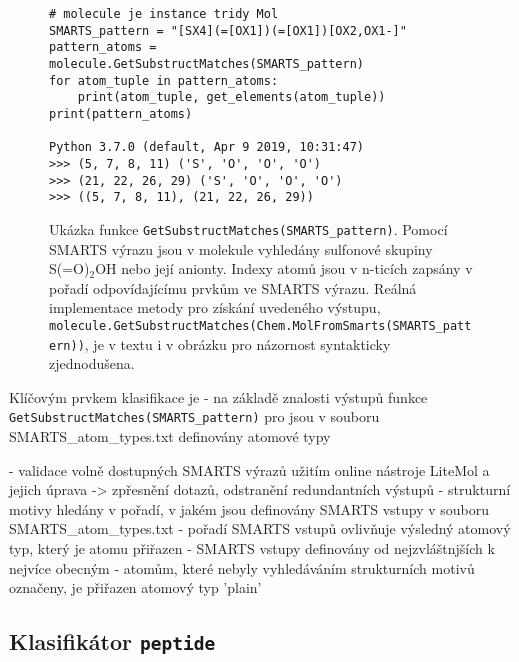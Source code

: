 \begin{figure}[h]
\label{smarts_tuples}
\begin{lstlisting}
# molecule je instance tridy Mol
SMARTS_pattern = "[SX4](=[OX1])(=[OX1])[OX2,OX1-]"
pattern_atoms = molecule.GetSubstructMatches(SMARTS_pattern)
for atom_tuple in pattern_atoms:
    print(atom_tuple, get_elements(atom_tuple))
print(pattern_atoms)

Python 3.7.0 (default, Apr 9 2019, 10:31:47)
>>> (5, 7, 8, 11) ('S', 'O', 'O', 'O')
>>> (21, 22, 26, 29) ('S', 'O', 'O', 'O')
>>> ((5, 7, 8, 11), (21, 22, 26, 29))
\end{lstlisting}
\cprotect\caption{Ukázka funkce \verb|GetSubstructMatches(SMARTS_pattern)|. Pomo\-cí SMARTS výrazu
jsou v molekule vyhledány sulfonové skupiny S(=O)$_2$OH nebo její anionty. Indexy atomů jsou v n-ticích zapsány v pořadí odpovídajícímu prvkům ve SMARTS výrazu. Reálná implementace metody pro získání uvedeného výstupu, \verb|molecule.GetSubstructMatches(Chem.MolFromSmarts(SMARTS_pattern))|, je v textu i v obrázku pro názornost syntakticky zjednodušena.}
\end{figure}

Klíčovým prvkem klasifikace je 
- na základě znalosti výstupů funkce \verb|GetSubstructMatches(SMARTS_pattern)| pro jsou v souboru SMARTS\_atom\_types.txt definovány atomové typy 


- validace volně dostupných SMARTS výrazů užitím online nástroje LiteMol a jejich úprava -> zpřesnění dotazů, odstranění redundantních výstupů 
- strukturní motivy hledány v pořadí, v jakém jsou definovány SMARTS vstupy v souboru SMARTS\_atom\_types.txt - pořadí SMARTS vstupů ovlivňuje výsledný atomový typ, který je atomu přiřazen
- SMARTS vstupy definovány od nejzvláštnjších k nejvíce obecným 
- atomům, které nebyly vyhledáváním strukturních motivů označeny, je přiřazen atomový typ 'plain'


\subsection{Klasifikátor \texttt{peptide}}



 



